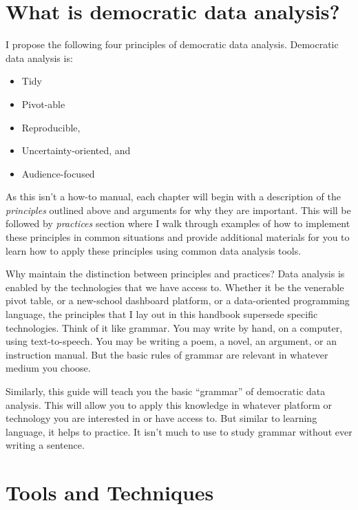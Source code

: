 \documentclass[]{book}
\providecommand{\tightlist}{%
  \setlength{\itemsep}{0pt}\setlength{\parskip}{0pt}}
\begin{document}
\hypertarget{what-is-democratic-data-analysis}{%
\section{What is democratic data analysis?}\label{what-is-democratic-data-analysis}}

I propose the following four principles of democratic data analysis. Democratic data analysis is:

\begin{itemize}
\tightlist
\item
  Tidy
\item
  Pivot-able
\item
  Reproducible,
\item
  Uncertainty-oriented, and
\item
  Audience-focused
\end{itemize}

As this isn't a how-to manual, each chapter will begin with a description of the \emph{principles} outlined above and arguments for why they are important. This will be followed by \emph{practices} section where I walk through examples of how to implement these principles in common situations and provide additional materials for you to learn how to apply these principles using common data analysis tools.

Why maintain the distinction between principles and practices? Data analysis is enabled by the technologies that we have access to. Whether it be the venerable pivot table, or a new-school dashboard platform, or a data-oriented programming language, the principles that I lay out in this handbook supersede specific technologies. Think of it like grammar. You may write by hand, on a computer, using text-to-speech. You may be writing a poem, a novel, an argument, or an instruction manual. But the basic rules of grammar are relevant in whatever medium you choose.

Similarly, this guide will teach you the basic ``grammar'' of democratic data analysis. This will allow you to apply this knowledge in whatever platform or technology you are interested in or have access to. But similar to learning language, it helps to practice. It isn't much to use to study grammar without ever writing a sentence.

\hypertarget{tools-and-techniques}{%
\section{Tools and Techniques}\label{tools-and-techniques}}
\end{document}
